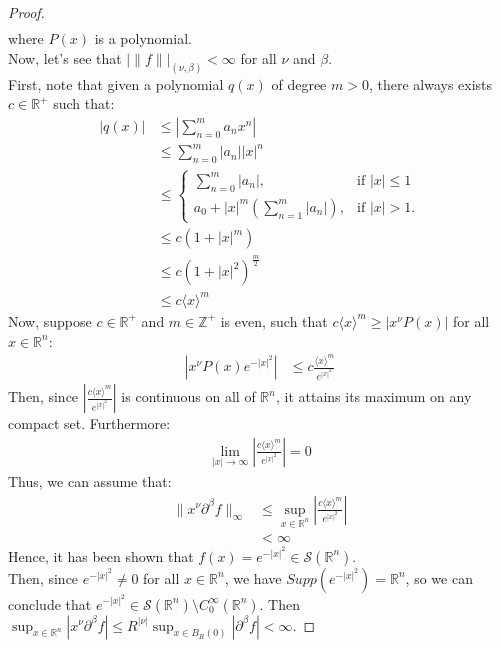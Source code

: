 \begin{proof}{}
\begin{align*}
  \end{align*}
  where $P(x)$ is a polynomial.\\
  Now, let's see that $|\|f\||_{(\nu,\beta)} < \infty$ for all $\nu$ and $\beta$.\\
  First, note that given a polynomial $q(x)$ of degree $m > 0$, there always exists $c \in \mathbb{R}^+$ such that:
  \begin{align*}
    |q(x)| &\leq \left| \sum_{n=0}^{m} a_n x^n \right|\\
    &\leq \sum_{n=0}^{m} |a_n| |x|^n\\
    &\leq \begin{cases}
      \sum_{n=0}^{m} |a_n|, & \text{if } |x| \leq 1\\
      a_0 + |x|^m \left( \sum_{n=1}^{m} |a_n| \right), & \text{if } |x| > 1.
    \end{cases}\\
    &\leq c(1 + |x|^m)\\
    &\leq c(1 + |x|^2)^{\frac{m}{2}}\\
    &\leq c \langle x \rangle^m 
  \end{align*}
  Now, suppose $c \in \mathbb{R}^+$ and $m \in \mathbb{Z}^+$ is even, such that $c \langle x \rangle^m \geq |x^{\nu} P(x)|$ for all $x \in \mathbb{R}^n$:
  \begin{align*}
    |x^{\nu} P(x) e^{-|x|^2}| &\leq c \frac{\langle x \rangle^m}{e^{|x|^2}}
  \end{align*}
  Then, since $\left| \frac{c \langle x \rangle^m}{e^{|x|^2}} \right|$ is continuous on all of $\mathbb{R}^n$, it attains its maximum on any compact set. Furthermore:
  \begin{align*}
    \lim_{|x| \rightarrow \infty} \left| \frac{c \langle x \rangle^m}{e^{|x|^2}} \right| = 0
  \end{align*}
  Thus, we can assume that:
  \begin{align*}
    \|x^{\nu} \partial^{\beta} f\|_{\infty} &\leq \sup_{x \in \mathbb{R}^n} \left| \frac{c \langle x \rangle^m}{e^{|x|^2}} \right|\\
    &< \infty
  \end{align*}
  Hence, it has been shown that $f(x) = e^{-|x|^2} \in \mathcal{S}(\mathbb{R}^n)$.\\
  Then, since $e^{-|x|^2} \neq 0$ for all $x \in \mathbb{R}^n$, we have $Supp(e^{-|x|^2}) = \mathbb{R}^n$, so we can conclude that $e^{-|x|^2} \in \mathcal{S}(\mathbb{R}^n) \setminus C^{\infty}_{0}(\mathbb{R}^n)$.
  Then $\sup_{x\in\mathbb{R}^n}|x^{\nu}\partial^{\beta}f|\leq R^{|\nu|}\sup_{x\in B_{R}(0)}|\partial^{\beta}f|<\infty$.
\end{proof}
